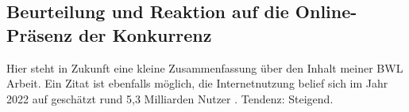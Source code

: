 \subsection{Beurteilung und Reaktion auf die Online-Präsenz der Konkurrenz}

Hier steht in Zukunft eine kleine Zusammenfassung über den Inhalt meiner BWL Arbeit. Ein Zitat ist ebenfalls möglich, die Internetnutzung belief sich im Jahr 2022 auf geschätzt rund 5,3 Milliarden Nutzer \cite{internetnutzerBU}. Tendenz: Steigend.
